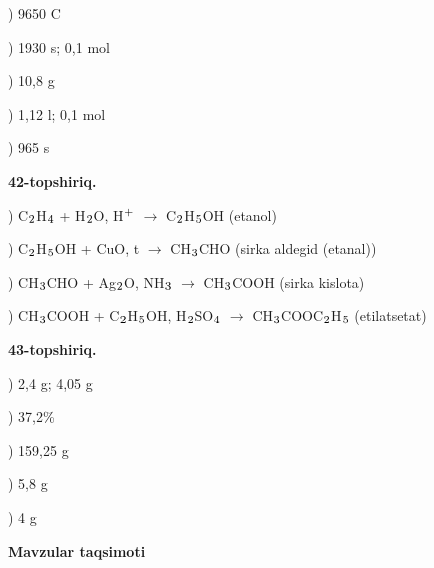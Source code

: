 \documentclass[11pt,a4paper]{article}
\renewcommand{\textsubscript}[1]{\ensuremath{_{\text{\fontsize{8}{8}\selectfont #1}}}}
\renewcommand{\textsuperscript}[1]{\ensuremath{^{\text{\fontsize{8}{8}\selectfont #1}}}}
\begin{document}
) 9650 C\par
{}) 1930 s; 0,1 mol\par
{}) 10,8 g\par
{}) 1,12 l; 0,1 mol\par
{}) 965 s\par
\noindent\textbf{42-topshiriq.}\par
{}) C\textsubscript{2}H\textsubscript{4} + H\textsubscript{2}O, H\textsuperscript{+} $\to$ C\textsubscript{2}H\textsubscript{5}OH (etanol)\par
{}) C\textsubscript{2}H\textsubscript{5}OH + CuO, t\textdegree{} $\to$ CH\textsubscript{3}CHO (sirka aldegid (etanal))\par
{}) CH\textsubscript{3}CHO + Ag\textsubscript{2}O, NH\textsubscript{3} $\to$ CH\textsubscript{3}COOH (sirka kislota)\par
{}) CH\textsubscript{3}COOH + C\textsubscript{2}H\textsubscript{5}OH, H\textsubscript{2}SO\textsubscript{4} $\to$ CH\textsubscript{3}COOC\textsubscript{2}H\textsubscript{5} (etilatsetat)\par
\noindent\textbf{43-topshiriq.}\par
{}) 2,4 g; 4,05 g\par
{}) 37,2\%\par
{}) 159,25 g\par
{}) 5,8 g\par
{}) 4 g\par
\par\bigskip\noindent\textbf{Mavzular taqsimoti}\par\smallskip
\end{document}
